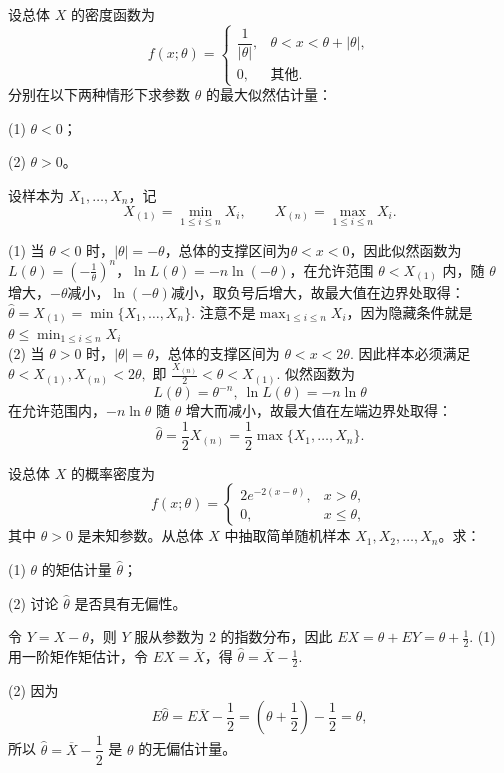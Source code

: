 \documentclass[lang=cn,11pt]{elegantbook}
\begin{document}
\begin{exercise}\label{exer:src-2010-0630-a-08-34credit}
设总体 \(X\) 的密度函数为
\[
f(x;\theta)=
\begin{cases}
\dfrac1{|\theta|}, & \theta<x<\theta+|\theta|,\\
0, & \text{其他}.
\end{cases}
\]
分别在以下两种情形下求参数 \(\theta\) 的最大似然估计量：\par
(1) \(\theta<0\)；\par
(2) \(\theta>0\)。
\end{exercise}
\begin{solution}
设样本为 \(X_1,\dots,X_n\)，记
\[
X_{(1)}=\min_{1\le i\le n}X_i,\qquad
X_{(n)}=\max_{1\le i\le n}X_i.
\]

(1) 当 \(\theta<0\) 时，\(|\theta|=-\theta\)，总体的支撑区间为\(\theta<x<0\)，因此似然函数为\(L(\theta)=\left(-\frac1\theta\right)^n\)，\(\ln L(\theta)=-n\ln\left(-\theta\right)\)，在允许范围 \(\theta<X_{(1)}\) 内，随 \(\theta\) 增大，$-\theta$减小，$\ln(-\theta)$减小，取负号后增大，故最大值在边界处取得：
\(
\hat\theta=X_{(1)}=\min\{X_1,\dots,X_n\}.
\)
注意不是$\max_{1\le i\le n}X_i$，因为隐藏条件就是$\theta\leq\min_{1\le i\le n}X_i$\\
(2) 当 \(\theta>0\) 时，\(|\theta|=\theta\)，总体的支撑区间为
\(
\theta<x<2\theta.
\)
因此样本必须满足
\(
\theta<X_{(1)},X_{(n)}<2\theta,
\)
即
\(
\frac{X_{(n)}}2<\theta<X_{(1)}.
\)
似然函数为
\[
L(\theta)=\theta^{-n},~\ln L(\theta)=-n\ln\theta
\]
在允许范围内，\(-n\ln\theta\) 随 \(\theta\) 增大而减小，故最大值在左端边界处取得：
\[
\hat\theta=\frac12X_{(n)}=\frac12\max\{X_1,\dots,X_n\}.
\]
\end{solution}


\begin{exercise}\label{exer:src-2011-ab-a-08-34credit}
设总体 \(X\) 的概率密度为
\[
f(x;\theta)=
\begin{cases}
2e^{-2(x-\theta)}, & x>\theta,\\
0, & x\le\theta,
\end{cases}
\]
其中 \(\theta>0\) 是未知参数。从总体 \(X\) 中抽取简单随机样本
\(X_1,X_2,\dots,X_n\)。求：\par
(1) \(\theta\) 的矩估计量 \(\hat\theta\)；\par
(2) 讨论 \(\hat\theta\) 是否具有无偏性。
\end{exercise}
\begin{solution}
令 \(Y=X-\theta\)，则 \(Y\) 服从参数为 \(2\) 的指数分布，因此
\(
EX=\theta+EY=\theta+\frac12.
\)
(1) 用一阶矩作矩估计，令 \(EX=\overline X\)，得
\(
\hat\theta=\overline X-\frac12.
\)

(2) 因为
\[
E\hat\theta=E\overline X-\frac12
=\left(\theta+\frac12\right)-\frac12
=\theta,
\]
所以 \(\hat\theta=\overline X-\dfrac12\) 是 \(\theta\) 的无偏估计量。
\end{solution}
\end{document}
